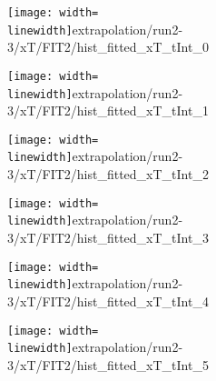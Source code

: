 \begin{figure}
\begin{subfigure}{0.45\linewidth}
\texttt{[image: width=\\linewidth]}{extrapolation/run2-3/xT/FIT2/hist_fitted_xT_tInt_0}
\end{subfigure}
\begin{subfigure}{0.45\linewidth}
\texttt{[image: width=\\linewidth]}{extrapolation/run2-3/xT/FIT2/hist_fitted_xT_tInt_1}
\end{subfigure}
\begin{subfigure}{0.45\linewidth}
\texttt{[image: width=\\linewidth]}{extrapolation/run2-3/xT/FIT2/hist_fitted_xT_tInt_2}
\end{subfigure}
\begin{subfigure}{0.45\linewidth}
\texttt{[image: width=\\linewidth]}{extrapolation/run2-3/xT/FIT2/hist_fitted_xT_tInt_3}
\end{subfigure}
\begin{subfigure}{0.45\linewidth}
\texttt{[image: width=\\linewidth]}{extrapolation/run2-3/xT/FIT2/hist_fitted_xT_tInt_4}
\end{subfigure}
\begin{subfigure}{0.45\linewidth}
\texttt{[image: width=\\linewidth]}{extrapolation/run2-3/xT/FIT2/hist_fitted_xT_tInt_5}
\end{subfigure}
\end{figure}
